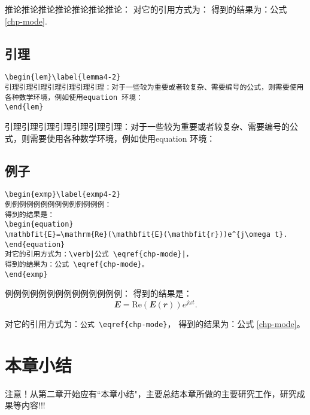 \begin{cor}\label{cor4-2}
推论推论推论推论推论推论推论：
对它的引用方式为：
得到的结果为：公式 \eqref{chp-mode}.
\end{cor}

\subsection{引理}\label{lem}
\begin{verbatim}
\begin{lem}\label{lemma4-2}
引理引理引理引理引理引理引理：对于一些较为重要或者较复杂、需要编号的公式，则需要使用各种数学环境，例如使用equation 环境：
\end{lem}
\end{verbatim}
\begin{lem}\label{lemma4-2}
引理引理引理引理引理引理引理：对于一些较为重要或者较复杂、需要编号的公式，则需要使用各种数学环境，例如使用equation 环境：
\end{lem}

\subsection{例子}\label{exmp}
\begin{verbatim}
\begin{exmp}\label{exmp4-2}
例例例例例例例例例例例例例例：
得到的结果是：
\begin{equation}
\mathbfit{E}=\mathrm{Re}(\mathbfit{E}(\mathbfit{r}))e^{j\omega t}.
\end{equation}
对它的引用方式为：\verb|公式 \eqref{chp-mode}|，
得到的结果为：公式 \eqref{chp-mode}。
\end{exmp}
\end{verbatim}
\begin{exmp}\label{exmp4-2}
例例例例例例例例例例例例例例：
得到的结果是：
\begin{equation}
\mathbfit{E}=\mathrm{Re}(\mathbfit{E}(\mathbfit{r}))e^{j\omega t}.
\end{equation}

对它的引用方式为：\verb|公式 \eqref{chp-mode}|，
得到的结果为：公式 \eqref{chp-mode}。
\end{exmp}

\section{本章小结}\label{section4-10}
注意！从第二章开始应有``本章小结"，主要总结本章所做的主要研究工作，研究成果等内容!!!

%
